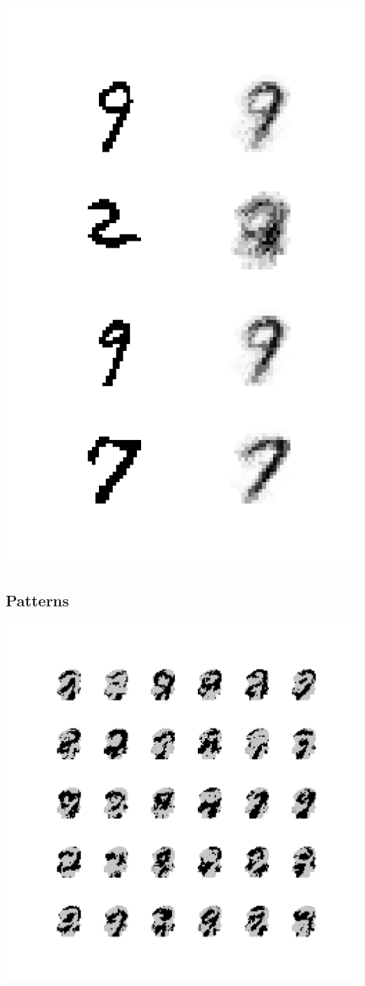 \documentclass[11pt]{article}
\begin{document}
\includegraphics[width=.9\linewidth]{figures/recon_2.png}
\subsection*{Patterns}
\label{sec-7-3}
\includegraphics[width=.9\linewidth]{figures/snb_1_1.png}
\end{document}
